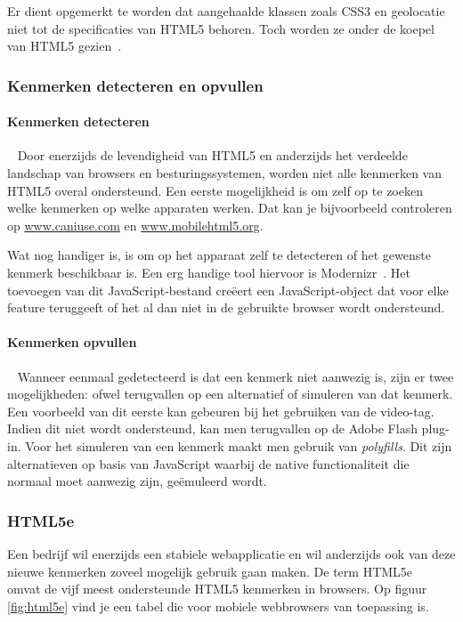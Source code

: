 Er dient opgemerkt te worden dat aangehaalde klassen zoals CSS3 en geolocatie niet tot de specificaties van HTML5 behoren. Toch worden ze onder de koepel van HTML5 gezien~\cite{MacDonald2011}.

\subsubsection{Kenmerken detecteren en opvullen}
\paragraph{Kenmerken detecteren}~\cite{MacDonald2011}
Door enerzijds de levendigheid van HTML5 en anderzijds het verdeelde landschap van browsers en besturingssystemen, worden niet alle kenmerken van HTML5 overal ondersteund. Een eerste mogelijkheid is om zelf op te zoeken welke kenmerken op welke apparaten werken. Dat kan je bijvoorbeeld controleren op \url{www.caniuse.com} en \url{www.mobilehtml5.org}. 

Wat nog handiger is, is om op het apparaat zelf te detecteren of het gewenste kenmerk beschikbaar is. Een erg handige tool hiervoor is Modernizr~\cite{Modernizr2012}. Het toevoegen van dit JavaScript-bestand creëert een JavaScript-object dat voor elke feature teruggeeft of het al dan niet in de gebruikte browser wordt ondersteund.

\paragraph{Kenmerken opvullen}~\cite{MacDonald2011,Weyl2011}
Wanneer eenmaal gedetecteerd is dat een kenmerk niet aanwezig is, zijn er twee mogelijkheden: ofwel terugvallen op een alternatief of simuleren van dat kenmerk. Een voorbeeld van dit eerste kan gebeuren bij het gebruiken van de video-tag. Indien dit niet wordt ondersteund, kan men terugvallen op de Adobe Flash plug-in. Voor het simuleren van een kenmerk maakt men gebruik van \emph{polyfills}. Dit zijn alternatieven op basis van JavaScript waarbij de native functionaliteit die normaal moet aanwezig zijn, geëmuleerd wordt.

\subsubsection{HTML5e}
Een bedrijf wil enerzijds een stabiele webapplicatie en wil anderzijds ook van deze nieuwe kenmerken zoveel mogelijk gebruik gaan maken. De term HTML5e~\cite{Hales2012} omvat de vijf meest ondersteunde HTML5 kenmerken in browsers. Op figuur \ref{fig:html5e} vind je een tabel die voor mobiele webbrowsers van toepassing is.


